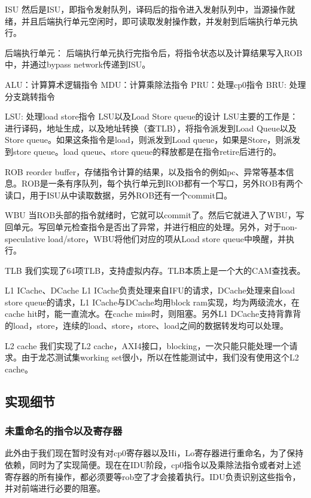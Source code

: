 \documentclass[lang=cn,11pt,a4paper]{elegantpaper}
\begin{document}
ISU
然后是ISU，即指令发射队列，译码后的指令进入发射队列中，当源操作就绪，并且后端执行单元空闲时，即可读取发射操作数，并发射到后端执行单元执行。


后端执行单元：
后端执行单元执行完指令后，将指令状态以及计算结果写入ROB中，并通过bypass network传递到ISU。

ALU：计算算术逻辑指令
MDU：计算乘除法指令
PRU：处理cp0指令
BRU: 处理分支跳转指令

LSU: 处理load store指令
LSU以及Load Store queue的设计
LSU主要的工作是：
进行译码，地址生成，以及地址转换（查TLB），将指令派发到Load Queue以及Store queue。如果这条指令是load，则派发到Load queue，如果是Store，则派发到store queue。load queue、store queue的释放都是在指令retire后进行的。

ROB
reorder buffer，存储指令计算的结果，以及指令的例如pc、异常等基本信息。ROB是一条有序队列，每个执行单元到ROB都有一个写口，另外ROB有两个读口，用于ISU从中读取数据，另外ROB还有一个commit口。

WBU
当ROB头部的指令就绪时，它就可以commit了。然后它就进入了WBU，写回单元。写回单元检查指令是否出了异常，并进行相应的处理。另外，对于non-speculative load/store，WBU将他们对应的项从Load store queue中唤醒，并执行。

TLB
我们实现了64项TLB，支持虚拟内存。TLB本质上是一个大的CAM查找表。

L1 ICache、DCache
L1 ICache负责处理来自IFU的请求，DCache处理来自load store queue的请求，L1 ICache与DCache均用block ram实现，均为两级流水，在cache hit时，能一直流水。在cache miss时，则阻塞。另外L1 DCache支持背靠背的load，store，连续的load、store，store、load之间的数据转发均可以处理。

L2 cache
我们实现了L2 cache，AXI4接口，blocking，一次只能只能处理一个请求。由于龙芯测试集working set很小，所以在性能测试中，我们没有使用这个L2 cache。

\subsection{实现细节}

\subsubsection{未重命名的指令以及寄存器}

此外由于我们现在暂时没有对cp0寄存器以及Hi，Lo寄存器进行重命名，为了保持依赖，同时为了实现简便。现在在IDU阶段，cp0指令以及乘除法指令或者对上述寄存器的所有操作，都必须要等rob空了才会接着执行。IDU负责识别这些指令，并对前端进行必要的阻塞。
\end{document}
